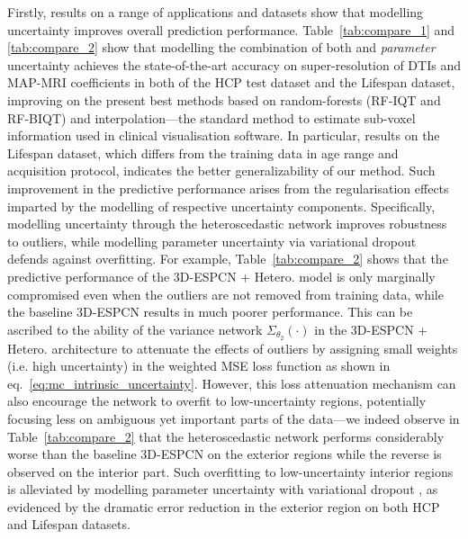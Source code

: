 Firstly, results on a range of applications and datasets show that modelling uncertainty improves overall prediction performance. Table~\ref{tab:compare_1} and \ref{tab:compare_2} show that modelling the combination of both \textit{} and \textit{parameter} uncertainty achieves the state-of-the-art accuracy on super-resolution of DTIs and MAP-MRI coefficients in both of the HCP test dataset and the Lifespan dataset, improving on the present best methods based on random-forests (RF-IQT\cite{alexander2017image} and RF-BIQT\cite{tanno2016bayesian}) and interpolation---the standard method to estimate sub-voxel information used in clinical visualisation software. In particular, results on the Lifespan dataset, which differs from the training data in age range and acquisition protocol, indicates the better generalizability of our method. Such improvement in the predictive performance arises from the regularisation effects imparted by the modelling of respective uncertainty components. Specifically, modelling  uncertainty through the heteroscedastic network improves robustness to outliers, while modelling parameter uncertainty via variational dropout defends against overfitting. For example,  Table~\ref{tab:compare_2} shows that the predictive performance of the 3D-ESPCN + Hetero. model is only marginally compromised even when the outliers are not removed from training data, while the baseline 3D-ESPCN results in much poorer performance. This can be ascribed to the ability of the variance network $\Sigma_{\theta_2}(\cdot)$ in the 3D-ESPCN + Hetero. architecture to attenuate the effects of outliers by assigning small weights (i.e. high uncertainty) in the weighted MSE loss function as shown in eq.~\eqref{eq:mc_intrinsic_uncertainty}. However, this loss attenuation mechanism can also encourage the network to overfit to low-uncertainty regions, potentially focusing less on ambiguous yet important parts of the data---we indeed observe in Table~\ref{tab:compare_2}  that the heteroscedastic network performs considerably worse than the baseline 3D-ESPCN on the exterior regions while the reverse is observed on the interior part. Such overfitting to low-uncertainty interior regions is alleviated by modelling parameter uncertainty with variational dropout \cite{kingma2015variational}, as evidenced by the dramatic error reduction in the exterior region on both HCP and Lifespan datasets. 

